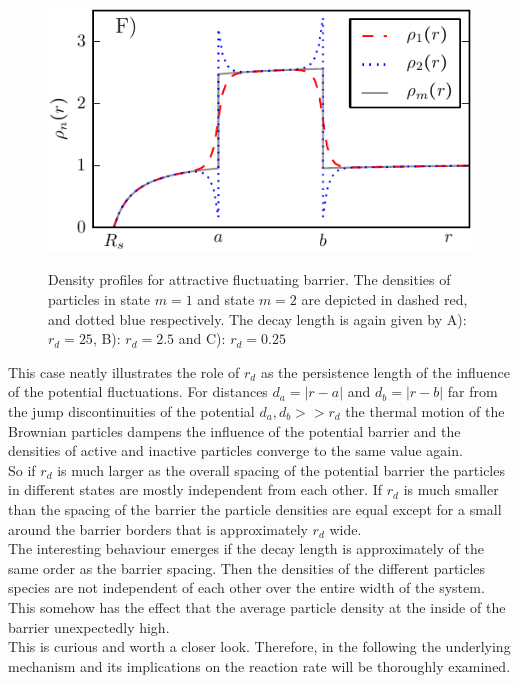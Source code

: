 \begin{minipage}[t]{0.5 \textwidth}
    \begin{figure}[H]
        \includegraphics[width = 1 \textwidth]{plots/d6.pdf}
    \end{figure}
\end{minipage}\hspace{0.02\textwidth}\begin{minipage}[t]{0.48 \textwidth}
    \begin{figure}[H]
        \caption{Density profiles for attractive fluctuating barrier. The densities of particles in state $m=1$ and state $m=2$ are depicted in dashed red, and dotted blue respectively. The decay length is again given by A): $r_d = 25$, B): $r_d=2.5$ and C): $r_d=0.25$\label{att_symm_dens_profile}}
    \end{figure}
\end{minipage} 
\newpage
This case neatly illustrates the role of $r_d$ as the persistence length of the influence of the potential fluctuations. For distances $d_a = |r - a|$ and $d_b = |r - b|$ far from the jump discontinuities of the potential $d_a, d_b >> r_d$ the thermal motion of the Brownian particles dampens the influence of the potential barrier and the densities of active and inactive particles converge to the same value again.\\
So if $r_d$ is much larger as the overall spacing of the potential barrier the particles in different states are mostly independent from each other. If $r_d$ is much smaller than the spacing of the barrier the particle densities are equal except for a small around the barrier borders that is approximately $r_d$ wide.\\
The interesting behaviour emerges if the decay length is approximately of the same order as the barrier spacing. Then the densities of the different particles species are not independent of each other over the entire width of the system. This somehow has the effect that the average particle density at the inside of the barrier unexpectedly high. \\
This is curious and worth a closer look. Therefore, in the following the underlying mechanism and its implications on the reaction rate will be thoroughly examined. \\ 


